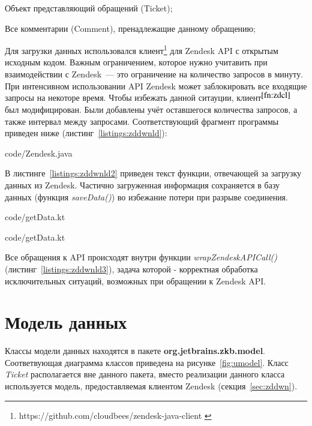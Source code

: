 \begin{enumerate*}
\item Объект представляющий обращений (Ticket);
\item Все комментарии (Comment), пренадлежащие данному обращению;
\end{enumerate*}

Для загрузки данных использовался клиент\footnote{https://github.com/cloudbees/zendesk-java-client \label{fn:zdcl}} для Zendesk API с открытым исходным кодом. Важным ограничением, которое нужно учитавить при взаимодействии с Zendesk~--- это ограничение на количество запросов в минуту. При интенсивном использовании API Zendesk может заблокировать все входящие запросы на некоторе время. Чтобы избежать данной ситауции, клиент$^{\ref{fn:zdcl}}$ был модифицирован. Были добавлены учёт оставшегося количества запросов, а также интервал между запросами. Соответствующий фрагмент программы приведен ниже (листинг~\ref{listings:zddwnld}):


{code/Zendesk.java}

В листинге~\ref{listings:zddwnld2} приведен текст функции, отвечающей за загрузку данных из Zendesk. Частично загруженная информация сохраняется в базу данных (функция \textit{saveData()}) во избежание потери при разрыве соединения.


{code/getData.kt}


{code/getData.kt}

Все обращения к API происходят внутри функции \textit{wrapZendeskAPICall()} (листинг~\ref{listings:zddwnld3}), задача которой - корректная обработка исключительных ситуаций, возможных при обращении к Zendesk API.

\section{Модель данных}

Классы модели данных находятся в пакете \textbf{org.jetbrains.zkb.model}. Соответвующая диаграмма классов приведена на рисунке~\ref{fig:umodel}. Класс \textit{Ticket} располагается вне данного пакета, вместо реализации данного класса используется модель, предоставляемая клиентом Zendesk (секция~\ref{sec:zddwn}).

